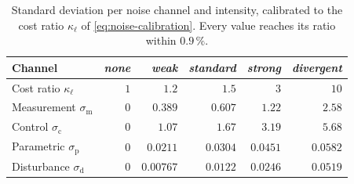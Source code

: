 \begin{table}[htbp]
\centering
\caption{Standard deviation per noise channel and intensity, calibrated to the cost ratio $\kappa_{\ell}$ of \eqref{eq:noise-calibration}. Every value reaches its ratio within $0.9\,\%$.}
\label{tab:noise-levels}
\begin{tabular}{@{}lrrrrr@{}}
\toprule
Channel & \emph{none} & \emph{weak} & \emph{standard} & \emph{strong} & \emph{divergent} \\
\midrule
Cost ratio $\kappa_{\ell}$ & $1$ & $1.2$ & $1.5$ & $3$ & $10$ \\
\midrule
Measurement $\sigma_{\mathrm{m}}$ & $0$ & $0.389$ & $0.607$ & $1.22$ & $2.58$ \\
Control $\sigma_{\mathrm{c}}$ & $0$ & $1.07$ & $1.67$ & $3.19$ & $5.68$ \\
Parametric $\sigma_{\mathrm{p}}$ & $0$ & $0.0211$ & $0.0304$ & $0.0451$ & $0.0582$ \\
Disturbance $\sigma_{\mathrm{d}}$ & $0$ & $0.00767$ & $0.0122$ & $0.0246$ & $0.0519$ \\
\bottomrule
\end{tabular}
\end{table}
